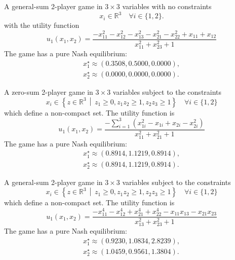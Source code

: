\begin{game}\label{ex.zhou19.5.8.i}
A general-sum 2-player game in $3 \times 3$ variables with no constraints
\[
x_i \in \mathbb{R}^3 \quad \forall i \in \{1,2\}.
\]
with the utility function \cite[Example~5.8 (i)]{zhou.wang.ea:saddle}
\[
u_1(x_1, x_2) =
\frac{
- x_{11}^2 - x_{12}^2 - x_{13}^2 - x_{21}^2 - x_{22}^2 + x_{11} + x_{12}
}{
x_{11}^2 + x_{23}^2 + 1
}
\]
The game has a pure Nash equilibrium:
\begin{align*}
x_1^\star \approx (0.3508, 0.5000, 0.0000), \\
x_2^\star \approx (0.0000, 0.0000, 0.0000).
\end{align*}
\end{game}

\begin{game}\label{ex.zhou19.5.9.i}
A zero-sum 2-player game in $3 \times 3$ variables subject to the constraints
\[
x_i \in \left\{z \in \mathbb{R}^3 \,\middle|\, z_1 \geq 0, z_1z_2 \geq 1, z_2z_3 \geq 1 \right\} \quad \forall i \in \{1,2\}
\]
which define a non-compact set. The utility function \cite[Example~5.9 (i)]{zhou.wang.ea:saddle} is
\[
u_1(x_1, x_2) =
\frac{
- \sum_{i=1}^{3} (x_{1i}^2 - x_{1i} + x_{2i} - x_{2i}^2)
}{
x_{11}^2 + x_{21}^2 + 1
}
\]
The game has a pure Nash equilibrium:
\begin{align*}
x_1^\star \approx (0.8914, 1.1219, 0.8914), \\
x_2^\star \approx (0.8914, 1.1219, 0.8914).
\end{align*}
\end{game}


\begin{game}\label{ex.zhou19.5.9.ii}
A general-sum 2-player game in $3 \times 3$ variables subject to the constraints
\[
x_i \in \left\{z \in \mathbb{R}^3 \,\middle|\, z_1 \geq 0, z_1z_2 \geq 1, z_2z_3 \geq 1 \right\} \quad \forall i \in \{1,2\}
\]
which define a non-compact set. The utility function \cite[Example~5.9 (ii)]{zhou.wang.ea:saddle} is
\[
u_1(x_1, x_2) =
\frac{
- x_{11}^4 - x_{12}^4 + x_{21}^4 + x_{22}^4 - x_{11} x_{13} - x_{21} x_{23}
}{
x_{13}^2 + x_{23}^2 + 1
}
\]
The game has a pure Nash equilibrium:
\begin{align*}
x_1^\star \approx (0.9230, 1.0834, 2.8239), \\
x_2^\star \approx (1.0459, 0.9561, 1.3804).
\end{align*}
\end{game}



